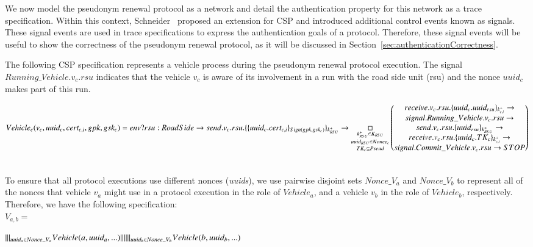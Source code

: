\documentclass[preprint,12pt]{elsarticle}
\begin{document}
We now model the pseudonym renewal protocol as a network and detail the authentication property for this network as a trace specification. Within this context, Schneider~\cite{schneider1998verifying} proposed an extension for CSP and introduced additional control events known as signals. These signal events are used in trace specifications to express the authentication goals of a protocol. Therefore, these signal events will be useful to show the correctness of the pseudonym renewal protocol, as it will be discussed in Section~\ref{sec:authenticationCorrectness}.

The following CSP specification represents a vehicle process during the pseudonym renewal protocol execution. The signal $Running\_Vehicle.v_c.rsu$ indicates that the vehicle $v_{c}$ is aware of its involvement in a run with the road side unit (rsu) and the nonce $uuid_c$ makes part of this run.
\\

\parbox[t]{1.2\textwidth}{$Vehicle_c(v_c, uuid_c, cert_{c,i}, gpk, gsk_c) = \\
env?rsu:RoadSide \rightarrow send.v_c.rsu.\{ \{uuid_c.cert_{c,i} \}_{Sign(gpk, gsk_{c})}\}_{k^{+}_{RSU}} \rightarrow \\
  \underset{TK_c \subseteq Pseud}{\underset{uuid_{RSU} \in Nonce_c}{\underset{ k^{+}_{RSU} \in K_{RSU} }{\Box}}}
  \begin{pmatrix}
    receive.v_c.rsu.\{uuid_c.uuid_{rsu}\}_{k^{+}_{c, i}} \rightarrow \\
    signal.Running\_Vehicle.v_c.rsu \rightarrow \\
    send.v_c.rsu.\{ uuid_{rsu}\}_{k^{+}_{RSU}} \rightarrow \\
    receive.v_c.rsu.\{ uuid_c.TK_c\}_{k^{+}_{c, i}} \rightarrow \\
    signal.Commit\_Vehicle.v_c.rsu \rightarrow STOP
  \end{pmatrix}
$}
\\

To ensure that all protocol executions use different nonces (\textit{uuids}), we use pairwise disjoint sets $Nonce\_V_a$ and $Nonce\_V_b$ to represent all of the nonces that vehicle $v_a$ might use in a protocol execution in the role of $Vehicle_{a}$, and a vehicle $v_{b}$ in the role of $Vehicle_b$, respectively. Therefore, we have the following specification:
\\

$V_{a, b} = $ \parbox[t]{1.2\textwidth}{$|||_{uuid_a \in Nonce\_V_a} Vehicle(a, uuid_a, ...) \\
||| \\
|||_{uuid_b \in Nonce\_V_b} Vehicle(b, uuid_b, ...)  \\
$}
\\
\end{document}
